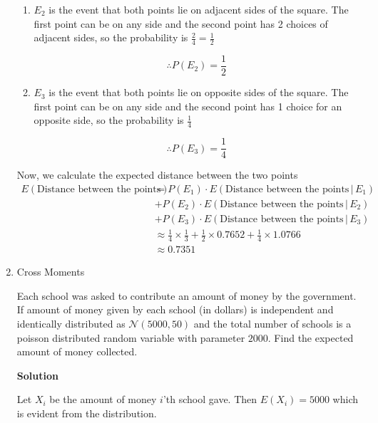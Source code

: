 \documentclass[12pt, oneside]{article}
\begin{document}
\begin{enumerate}
{\begin{enumerate}
{            \[\therefore P(E_1) = \frac{1}{4}\]
        }
        \item {
            \(E_2\) is the event that both points lie on adjacent sides of the square.
            The first point can be on any side and the second point has 2 choices of
            adjacent sides, so the probability is \(\frac{2}{4} = \frac{1}{2}\)

            \[\therefore P(E_2) = \frac{1}{2}\]
        }
        \item {
            \(E_3\) is the event that both points lie on opposite sides of the square.
            The first point can be on any side and the second point has 1 choice for an
            opposite side, so the probability is \(\frac{1}{4}\)

            \[\therefore P(E_3) = \frac{1}{4}\]
        }
    \end{enumerate}

    Now, we calculate the expected distance between the two points
    \begin{align*}
        E(\text{Distance between the points}) &= P(E_1) \cdot E(\text{Distance between the points} \,|\, E_1) \\
                                              &+ P(E_2) \cdot E(\text{Distance between the points} \,|\, E_2) \\
                                              &+ P(E_3) \cdot E(\text{Distance between the points} \,|\, E_3) \\
                                              &\approx \frac{1}{4} \times \frac{1}{3} + \frac{1}{2} \times 0.7652
                                                   + \frac{1}{4} \times 1.0766 \\
                                              &\approx 0.7351
    \end{align*}
}

\item {
    Cross Moments

    Each school was asked to contribute an amount of money by the government. If amount
    of money given by each school (in dollars) is independent and identically distributed as \(\mathcal{N}(5000, 50)\)
    and the total number of schools is a poisson distributed random variable with parameter \(2000\).
    Find the expected amount of money collected.

    \textbf{Solution}

    Let \(X_i\) be the amount of money \(i\)'th school gave. Then \(E(X_i) = 5000\) which is evident
    from the distribution. 

}
\end{enumerate}
\end{document}

